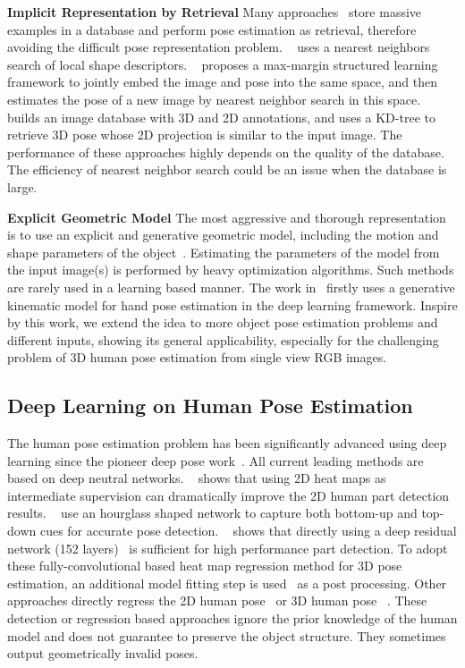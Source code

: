 \documentclass[runningheads]{llncs}
\begin{document}
\textbf{Implicit Representation by Retrieval}
Many approaches~\cite{Choi_2015_ICCV,Li_2015_ICCV,Yasin_2016_CVPR} store massive examples in a database and perform pose estimation as retrieval, therefore avoiding the difficult pose representation problem. ~\cite{Choi_2015_ICCV} uses a nearest neighbors search of local shape descriptors. ~\cite{Li_2015_ICCV} proposes a max-margin structured learning framework to jointly embed the image and pose into the same space, and then estimates the pose of a new image by nearest neighbor search in this space. ~\cite{Yasin_2016_CVPR} builds an image database with 3D and 2D annotations, and uses a KD-tree to retrieve 3D pose whose 2D projection is similar to the input image. The performance of these approaches highly depends on the quality of the database. The efficiency of nearest neighbor search could be an issue when the database is large.

\textbf{Explicit Geometric Model} The most aggressive and thorough representation is to use an explicit and generative geometric model, including the motion and shape parameters of the object~\cite{toby15,bogo2016smpl}. Estimating the parameters of the model from the input image(s) is performed by heavy optimization algorithms. Such methods are rarely used in a learning based manner. The work in~\cite{zhou2016model} firstly uses a generative kinematic model for hand pose estimation in the deep learning framework. Inspire by this work, we extend the idea to more object pose estimation problems and different inputs, showing its general applicability, especially for the challenging problem of 3D human pose estimation from single view RGB images.

\subsection{Deep Learning on Human Pose Estimation}
The human pose estimation problem has been significantly advanced using deep learning since the pioneer deep pose work~\cite{toshev2014deeppose}. All current leading methods are based on deep neutral networks. ~\cite{Wei_2016_CVPR} shows that using 2D heat maps as intermediate supervision can dramatically improve the 2D human part detection results. ~\cite{DBLP:journals/corr/NewellYD16} use an hourglass shaped network to capture both bottom-up and top-down cues for accurate pose detection. ~\cite{insafutdinov2016deepercut} shows that directly using a deep residual network (152 layers)~\cite{He_2016_CVPR} is sufficient for high performance part detection. To adopt these fully-convolutional based heat map regression method for 3D pose estimation, an additional model fitting step is used~\cite{Zhou_2016_CVPR} as a post processing. Other approaches directly regress the 2D human pose~\cite{toshev2014deeppose,Carreira_2016_CVPR} or 3D human pose ~\cite{li20143d,tekin2016structured,Tekin_2016_CVPR}. These detection or regression based approaches ignore the prior knowledge of the human model and does not guarantee to preserve the object structure. They sometimes output geometrically invalid poses.
\end{document}
